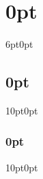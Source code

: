 \setlength{\parindent}{2.4em}
\setlength{\parskip}{0em}
\usepackage{indentfirst}
\usepackage{mathtools, nccmath}
\usepackage[page,header]{appendix}
\usepackage{titletoc}
\usepackage[labelfont=bf]{caption}
\usepackage{lscape}
\usepackage{setspace}
\newcommand{\blandscape}{\begin{landscape}}
\newcommand{\elandscape}{\end{landscape}}
\newcommand{\bcen}{\begin{center}}
\newcommand{\ecen}{\end{center}}
\newcommand{\tsp}{\thinspace}
\footskip 0.5in
\usepackage{titlesec}
\titlespacing\section{0pt}{6pt}{0pt}
\titlespacing\subsection{0pt}{10pt}{0pt}
\titlespacing\subsubsection{0pt}{10pt}{0pt}


